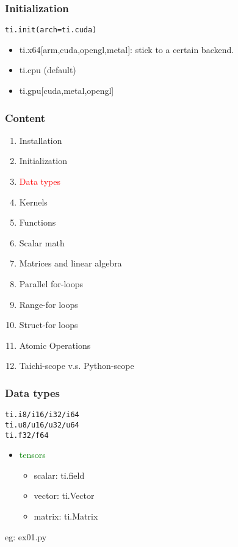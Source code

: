 \documentclass[serif,mathserif]{beamer}
\begin{document}
\begin{CJK}{UTF8}{gbsn}
\begin{frame}[fragile]
  \frametitle{Initialization}

  \begin{tcolorbox}
\begin{verbatim}
ti.init(arch=ti.cuda)
\end{verbatim}
  \end{tcolorbox}

  \begin{itemize}
  \item ti.x64[arm,cuda,opengl,metal]: stick to a certain backend.
  \item ti.cpu (default)
  \item ti.gpu[cuda,metal,opengl]
  \end{itemize}

\end{frame}

\begin{frame}
  \frametitle{Content}
  \begin{enumerate}
  \item Installation
  \item Initialization
  \item \textcolor{red}{Data types}
  \item Kernels
  \item Functions
  \item Scalar math
  \item Matrices and linear algebra
  \item Parallel for-loops
  \item Range-for loops
  \item Struct-for loops
  \item Atomic Operations
  \item Taichi-scope v.s. Python-scope
  \end{enumerate}
\end{frame}


\begin{frame}[fragile]
  \frametitle{Data types}
  \begin{tcolorbox}
\begin{verbatim}
ti.i8/i16/i32/i64
ti.u8/u16/u32/u64
ti.f32/f64
\end{verbatim}
  \end{tcolorbox}
  \begin{itemize}
  \item \textcolor{green}{tensors}
    \begin{itemize}
    \item scalar: ti.field
    \item vector: ti.Vector
    \item matrix: ti.Matrix
    \end{itemize}
  \end{itemize}
  eg: ex01.py
\end{frame}


\end{CJK}
\end{document}
